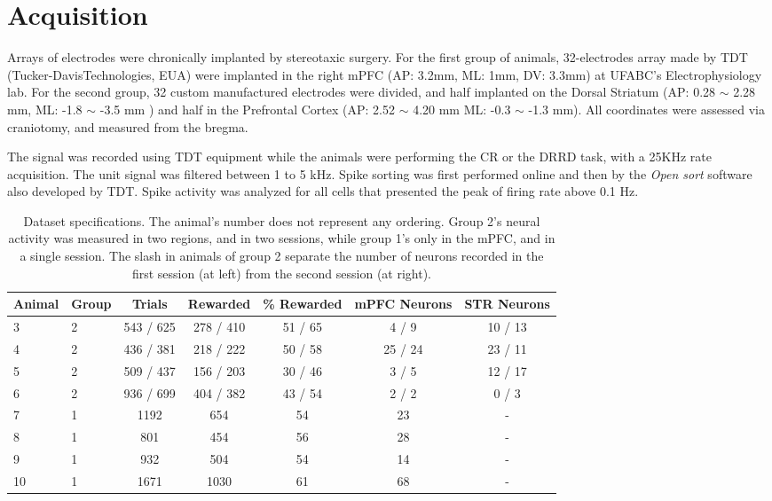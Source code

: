 \section{Acquisition}
\label{sec:acquisition}

    Arrays of electrodes were chronically implanted by stereotaxic surgery. For the first group of animals, 32-electrodes array made by TDT (Tucker-DavisTechnologies, EUA) were implanted in the right mPFC (AP: 3.2mm, ML: 1mm, DV: 3.3mm) at UFABC's Electrophysiology lab. For the second group, 32 custom manufactured electrodes were divided, and half implanted on the Dorsal Striatum (AP: 0.28 $\sim$ 2.28 mm, ML: -1.8 $\sim$ -3.5 mm ) and half in the Prefrontal Cortex (AP: 2.52 $\sim$ 4.20 mm ML: -0.3 $\sim$ -1.3 mm). All coordinates were assessed via craniotomy, and measured from the bregma.
    
    The signal was recorded using TDT equipment while the animals were performing the CR or the DRRD task, with a 25KHz rate acquisition. The unit signal was filtered between 1 to 5 kHz. Spike sorting was first performed online and then by the \textit{Open sort} software also developed by TDT. Spike activity was analyzed for all cells that presented the peak of firing rate above 0.1 Hz. 

\begin{table}[htp]
    \centering
    \begin{tabular}{l|l|c|c|c|c|c}
        Animal & Group & Trials & Rewarded & \% Rewarded &  mPFC Neurons & STR Neurons \\\hline
        3 & 2 &  543 / 625  &    278 / 410 &   51 / 65 &       4 / 9    &   10 / 13 \\
        4 & 2 &  436 / 381  &    218 / 222 &  50 / 58  &      25 / 24   &   23 / 11 \\
        5 & 2 &  509 / 437  &    156 / 203 &  30 / 46  &      3 / 5     &   12 / 17 \\
        6 & 2 &  936 / 699  &    404 / 382 &  43 / 54  &      2 / 2     &   0 / 3   \\
        7 & 1 &     1192    &    654       &    54     &     23       &     -     \\
        8 & 1 &      801    &    454       &    56     &     28       &     -     \\
        9 & 1 &      932    &    504       &    54     &     14       &     -     \\
        10& 1 &     1671    &    1030      &    61     &     68       &     -     \\
    \end{tabular}
    \caption[Dataset specifications]{Dataset specifications. The animal's number does not represent any ordering. Group 2's neural activity was measured in two regions, and in two sessions, while group 1's only in the mPFC, and in a single session. The slash in animals of group 2 separate the number of neurons recorded in the first session (at left) from the second session (at right).}
    \label{tab:subjects}
\end{table}